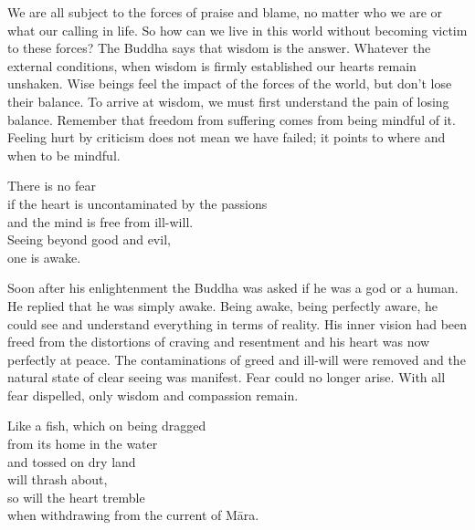 \begin{dhpRefl}
We are all subject to the forces of praise and blame, no matter who we are or what our calling in life. So how can we live in this world without becoming victim to these forces? The Buddha says that wisdom is the answer. Whatever the external conditions, when wisdom is firmly established our hearts remain unshaken. Wise beings feel the impact of the forces of the world, but don't lose their balance. To arrive at wisdom, we must first understand the pain of losing balance. Remember that freedom from suffering comes from being mindful of it. Feeling hurt by criticism does not mean we have failed; it points to where and when to be mindful.
\end{dhpRefl}


\begin{dhpVerse}{39}
\label{dhp-39}
There is no fear\\
if the heart is uncontaminated by the passions\\
and the mind is free from ill-will.\\
Seeing beyond good and evil,\\
one is awake.
\end{dhpVerse}

\begin{dhpRefl}
Soon after his enlightenment the Buddha was asked if he was a god or a human. He replied that he was simply awake. Being awake, being perfectly aware, he could see and understand everything in terms of reality. His inner vision had been freed from the distortions of craving and resentment and his heart was now perfectly at peace. The contaminations of greed and ill-will were removed and the natural state of clear seeing was manifest. Fear could no longer arise. With all fear dispelled, only wisdom and compassion remain.
\end{dhpRefl}


\begin{dhpVerse}{34}
\label{dhp-34}
Like a fish, which on being dragged \\
from its home in the water \\
and tossed on dry land \\
will thrash about,\\
so will the heart tremble\\
when withdrawing from the current of Māra.
\end{dhpVerse}

